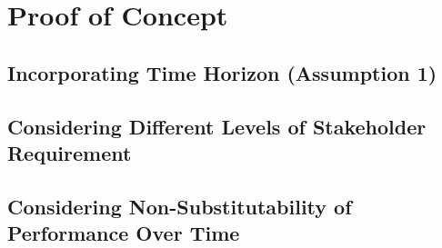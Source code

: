 
\renewcommand{\thechapter}{5}

\chapter{Proof of Concept}

\section{Incorporating Time Horizon (Assumption 1)}

\section{Considering Different Levels of Stakeholder Requirement}

\section{Considering Non-Substitutability of Performance Over Time}

